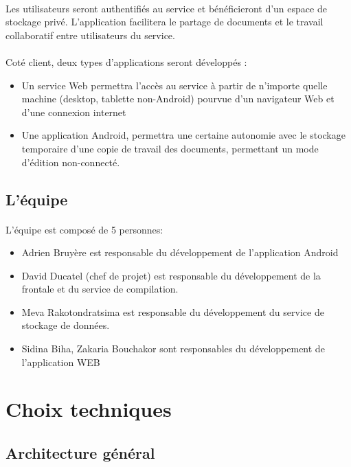 \documentclass[a4paper,12pt]{article}
\begin{document}
\paragraph*{} 
Les utilisateurs seront authentifiés au service et bénéficieront d'un espace
de stockage privé. L'application facilitera le partage de documents et le
travail collaboratif entre utilisateurs du service.
\paragraph*{} 
Coté client, deux types d'applications seront développés :

\begin{itemize}
 \item Un service Web permettra l'accès au service à partir de n'importe
quelle machine (desktop, tablette non-Android) pourvue d'un navigateur
Web et d'une connexion internet

 \item Une application Android, permettra une certaine autonomie avec le
stockage temporaire d'une copie de travail des documents, permettant
un mode d'édition non-connecté.
\end{itemize}

\subsection{L'équipe}
\paragraph*{}
L'équipe est composé de 5 personnes:
\begin{itemize}
 \item Adrien Bruyère est responsable du développement de l'application Android
 \item David Ducatel (chef de projet) est responsable du développement de la frontale et du service de compilation.
 \item Meva Rakotondratsima est responsable du développement du service de stockage de données.
 \item Sidina Biha, Zakaria Bouchakor sont responsables du développement de l'application WEB
\end{itemize}

\newpage
\section{Choix techniques}
\subsection{Architecture général}
\end{document}
